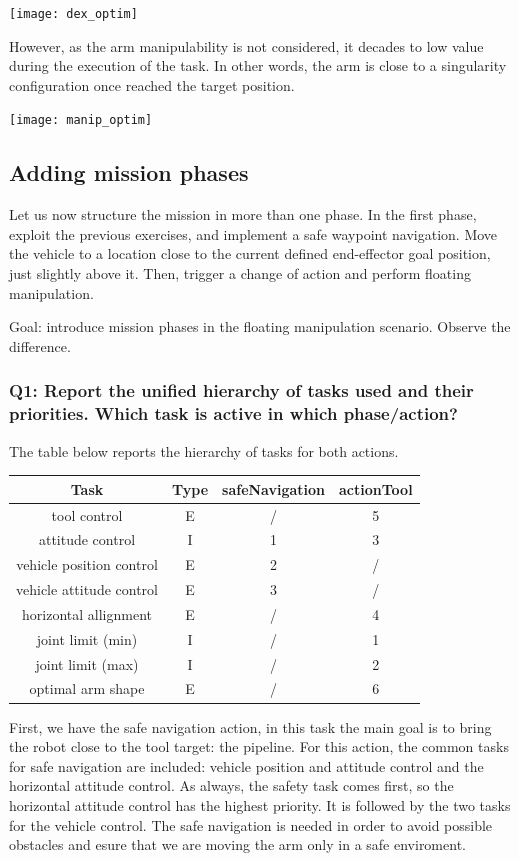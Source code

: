 \documentclass{article}
\begin{document}
\texttt{[image: dex\_optim]}

However, as the arm manipulability is not considered, it decades to low value during the execution of the task. In other words, the arm is close to a singularity configuration once reached the target position. 

\texttt{[image: manip\_optim]}

\subsection{Adding mission phases}
Let us now structure the mission in more than one phase. In the first phase, exploit the previous exercises, and implement a safe waypoint navigation. Move the vehicle to a location close to the current defined end-effector goal position, just slightly above it. Then, trigger a change of action and perform floating manipulation.

Goal: introduce mission phases in the floating manipulation scenario. Observe the difference.

\subsubsection{Q1: Report the unified hierarchy of tasks used and their priorities. Which task is active in which phase/action?}
The table below reports the hierarchy of tasks for both actions. 

\begin{tabular}{cccc}
	\toprule
	Task & Type & safeNavigation & actionTool	\\
	\midrule
	tool control                    & E & /  &	5	\\
	\hdashline
	attitude control                & I & 1  &	3	\\
	\hdashline
	vehicle position control        & E & 2  &	/	\\
	\hdashline
	vehicle attitude control        & E & 3  &	/	\\
	\hdashline
	horizontal allignment           & E & /  &	4	\\
	\hdashline
	joint limit (min)               & I & /  &	1	\\
	\hdashline
	joint limit (max)               & I & /  &	2	\\
	\hdashline
	optimal arm shape				& E & /  &	6	\\
	\bottomrule
\end{tabular}

First, we have the safe navigation action, in this task the main goal is to bring the robot close to the tool target: the pipeline. For this action, the common tasks for safe navigation are included: vehicle position and attitude control and the horizontal attitude control. As always, the safety task comes first, so the horizontal attitude control has the highest priority. It is followed by the two tasks for the vehicle control. The safe navigation is needed in order to avoid possible obstacles and esure that we are moving the arm only in a safe enviroment. 
\end{document}
